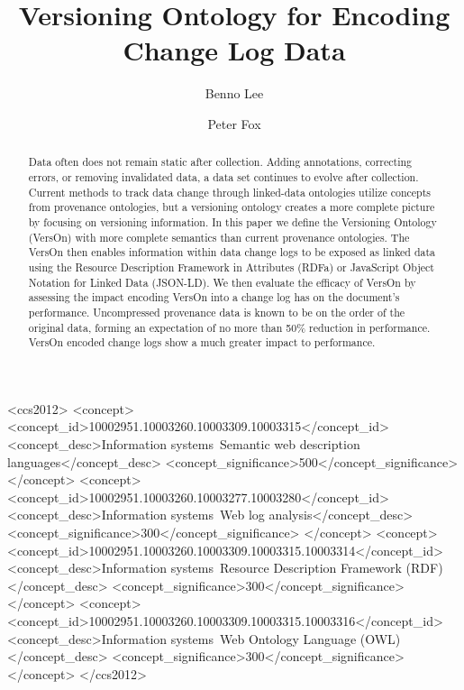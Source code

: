 \title{Versioning Ontology for Encoding Change Log Data}

\author{Benno Lee}
\author{Peter Fox}

\begin{abstract}
	Data often does not remain static after collection.
	Adding annotations, correcting errors, or removing invalidated data, a data set continues to evolve after collection.
	Current methods to track data change through linked-data ontologies utilize concepts from provenance ontologies, but a versioning ontology creates a more complete picture by focusing on versioning information.
	In this paper we define the Versioning Ontology (VersOn) with more complete semantics than current provenance ontologies.
	The VersOn then enables information within data change logs to be exposed as linked data using the Resource Description Framework in Attributes (RDFa) or JavaScript Object Notation for Linked Data (JSON-LD).
	We then evaluate the efficacy of VersOn by assessing the impact encoding VersOn into a change log has on the document's performance.
	Uncompressed provenance data is known to be on the order of the original data, forming an expectation of no more than 50\% reduction in performance.
	VersOn encoded change logs show a much greater impact to performance.
\end{abstract}

\begin{CCSXML}
	<ccs2012>
	<concept>
	<concept_id>10002951.10003260.10003309.10003315</concept_id>
	<concept_desc>Information systems~Semantic web description languages</concept_desc>
	<concept_significance>500</concept_significance>
	</concept>
	<concept>
	<concept_id>10002951.10003260.10003277.10003280</concept_id>
	<concept_desc>Information systems~Web log analysis</concept_desc>
	<concept_significance>300</concept_significance>
	</concept>
	<concept>
	<concept_id>10002951.10003260.10003309.10003315.10003314</concept_id>
	<concept_desc>Information systems~Resource Description Framework (RDF)</concept_desc>
	<concept_significance>300</concept_significance>
	</concept>
	<concept>
	<concept_id>10002951.10003260.10003309.10003315.10003316</concept_id>
	<concept_desc>Information systems~Web Ontology Language (OWL)</concept_desc>
	<concept_significance>300</concept_significance>
	</concept>
	</ccs2012>
\end{CCSXML}

